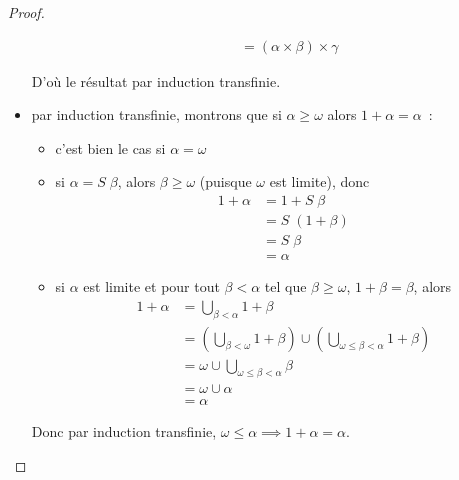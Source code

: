 \begin{proof}
\begin{itemize}
\begin{itemize}
\begin{align*}
        &= (\alpha\times\beta) \times \gamma
      \end{align*}
    \end{itemize}
    D'où le résultat par induction transfinie.
  \item par induction transfinie, montrons que si $\alpha \geq \omega$ alors
    $1 + \alpha = \alpha$~:
    \begin{itemize}
    \item c'est bien le cas si $\alpha = \omega$
    \item si $\alpha = S\;\beta$, alors $\beta \geq \omega$ (puisque $\omega$
      est limite), donc
      \begin{align*}
        1+\alpha &= 1 + S\;\beta \\
        &= S\;(1 + \beta) \\
        &= S\;\beta\\
        &= \alpha
      \end{align*}
    \item si $\alpha$ est limite et pour tout $\beta < \alpha$ tel que
      $\beta \geq \omega$, $1+\beta = \beta$, alors
      \begin{align*}
        1 + \alpha &= \bigcup_{\beta < \alpha} 1 + \beta \\
        &= \left(\bigcup_{\beta < \omega} 1 + \beta\right) \cup
        \left(\bigcup_{\omega \leq \beta < \alpha} 1 + \beta\right)\\
        &= \omega \cup \bigcup_{\omega\leq\beta < \alpha} \beta\\
        &= \omega \cup \alpha\\
        &= \alpha
      \end{align*}
    \end{itemize}
    Donc par induction transfinie,
    $\omega \leq \alpha \implies 1 + \alpha = \alpha$.


\end{itemize}
\end{proof}
